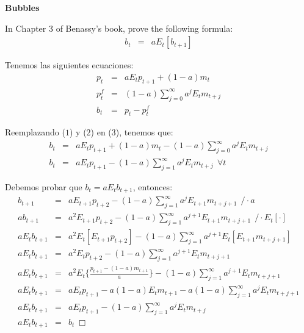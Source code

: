 \documentclass[11pt]{amsart}
\begin{document}
\bigskip
{\LARGE \textbf{Bubbles}}
\renewcommand{\labelenumi}{\arabic{enumi}.}

\medskip
In Chapter 3 of Benassy's book, prove the following formula:
\begin{eqnarray*}
b_{t} & = & aE_{t}[b_{t+1}]
\end{eqnarray*}

Tenemos las siguientes ecuaciones:
\begin{eqnarray}
p_{t} & = & aE_{t}p_{t+1}+(1-a)m_{t} \\
p_{t}^{f} & = & (1-a)\sum_{j=0}^{\infty}a^{j}E_{t}m_{t+j} \\
b_{t} & = & p_{t}-p_{t}^{f}
\end{eqnarray}

Reemplazando ($1$) y ($2$) en ($3$), tenemos que:
\begin{eqnarray*}
b_{t} & = & aE_{t}p_{t+1}+(1-a)m_{t}-(1-a)\sum_{j=0}^{\infty}a^{j}E_{t}m_{t+j} \\
b_{t} & = & aE_{t}p_{t+1}-(1-a)\sum_{j=1}^{\infty}a^{j}E_{t}m_{t+j} \ \ \forall t
\end{eqnarray*}

Debemos probar que $b_{t}=aE_{t}b_{t+1}$, entonces:
\begin{eqnarray*}
b_{t+1} & = & aE_{t+1}p_{t+2}-(1-a)\sum_{j=1}^{\infty}a^{j}E_{t+1}m_{t+j+1} \ \ /\cdot a \\
ab_{t+1} & = & a^{2}E_{t+1}p_{t+2}-(1-a)\sum_{j=1}^{\infty}a^{j+1}E_{t+1}m_{t+j+1} \ \ /\cdot E_{t}[\cdot] \\
aE_{t}b_{t+1} & = & a^{2}E_{t}[E_{t+1}p_{t+2}]-(1-a)\sum_{j=1}^{\infty}a^{j+1}E_{t}[E_{t+1}m_{t+j+1}] \\
aE_{t}b_{t+1} & = & a^{2}E_{t}p_{t+2}-(1-a)\sum_{j=1}^{\infty}a^{j+1}E_{t}m_{t+j+1} \\
aE_{t}b_{t+1} & = & a^{2}E_{t}\{ \frac{p_{t+1}-(1-a)m_{t+1}}{a} \}-(1-a)\sum_{j=1}^{\infty}a^{j+1}E_{t}m_{t+j+1} \\
aE_{t}b_{t+1} & = & aE_{t}p_{t+1}-a(1-a)E_{t}m_{t+1}-a(1-a)\sum_{j=1}^{\infty}a^{j}E_{t}m_{t+j+1} \\
aE_{t}b_{t+1} & = & aE_{t}p_{t+1}-(1-a)\sum_{j=1}^{\infty}a^{j}E_{t}m_{t+j} \\
aE_{t}b_{t+1} & = & b_{t} \ \Box
\end{eqnarray*}
\end{document}
